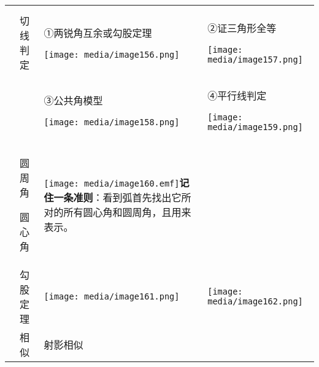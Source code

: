 \documentclass[a4paper,11pt,UTF8]{ctexart}
\begin{document}
\begin{longtable}[]{@{}llll@{}}
\toprule
\endhead
& & &\tabularnewline
\begin{minipage}[t]{0.22\columnwidth}\raggedright
\strut
\end{minipage} & \begin{minipage}[t]{0.22\columnwidth}\raggedright
切线判定\strut
\end{minipage} & \begin{minipage}[t]{0.22\columnwidth}\raggedright
①两锐角互余或勾股定理

\texttt{[image: media/image156.png]}\strut
\end{minipage} & \begin{minipage}[t]{0.22\columnwidth}\raggedright
②证三角形全等

\texttt{[image: media/image157.png]}\strut
\end{minipage}\tabularnewline
\begin{minipage}[t]{0.22\columnwidth}\raggedright
\strut
\end{minipage} & \begin{minipage}[t]{0.22\columnwidth}\raggedright
\strut
\end{minipage} & \begin{minipage}[t]{0.22\columnwidth}\raggedright
③公共角模型

\texttt{[image: media/image158.png]}\strut
\end{minipage} & \begin{minipage}[t]{0.22\columnwidth}\raggedright
④平行线判定

\texttt{[image: media/image159.png]}\strut
\end{minipage}\tabularnewline
\begin{minipage}[t]{0.22\columnwidth}\raggedright
\strut
\end{minipage} & \begin{minipage}[t]{0.22\columnwidth}\raggedright
圆周角

圆心角\strut
\end{minipage} & \begin{minipage}[t]{0.22\columnwidth}\raggedright
\texttt{[image: media/image160.emf]}\textbf{记住一条准则}：看到弧首先找出它所对的所有圆心角和圆周角，且用来表示。\strut
\end{minipage} & \begin{minipage}[t]{0.22\columnwidth}\raggedright
\strut
\end{minipage}\tabularnewline
& 勾股定理 &
\texttt{[image: media/image161.png]} &
\texttt{[image: media/image162.png]}\tabularnewline
\begin{minipage}[t]{0.22\columnwidth}\raggedright
\strut
\end{minipage} & \begin{minipage}[t]{0.22\columnwidth}\raggedright
相 似\strut
\end{minipage} & \begin{minipage}[t]{0.22\columnwidth}\raggedright
射影相似


\end{minipage}
\end{longtable}
\end{document}
